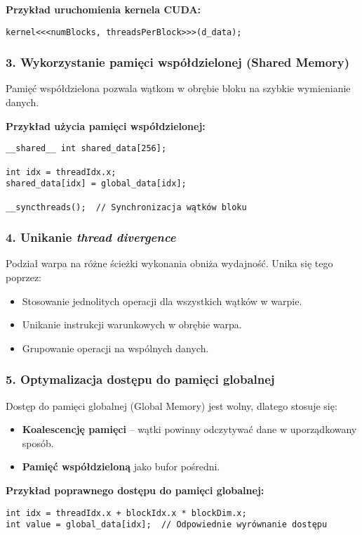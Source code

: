 \textbf{Przykład uruchomienia kernela CUDA:}
\begin{verbatim}
kernel<<<numBlocks, threadsPerBlock>>>(d_data);
\end{verbatim}

\subsubsection{3. Wykorzystanie pamięci współdzielonej (Shared Memory)}
Pamięć współdzielona pozwala wątkom w obrębie bloku na szybkie wymienianie danych.

\textbf{Przykład użycia pamięci współdzielonej:}
\begin{verbatim}
__shared__ int shared_data[256];

int idx = threadIdx.x;
shared_data[idx] = global_data[idx];

__syncthreads();  // Synchronizacja wątków bloku
\end{verbatim}

\subsubsection{4. Unikanie \textit{thread divergence}}
Podział warpa na różne ścieżki wykonania obniża wydajność. Unika się tego poprzez:

\begin{itemize}
    \item Stosowanie jednolitych operacji dla wszystkich wątków w warpie.
    \item Unikanie instrukcji warunkowych w obrębie warpa.
    \item Grupowanie operacji na wspólnych danych.
\end{itemize}

\subsubsection{5. Optymalizacja dostępu do pamięci globalnej}
Dostęp do pamięci globalnej (Global Memory) jest wolny, dlatego stosuje się:
\begin{itemize}
    \item \textbf{Koalescencję pamięci} – wątki powinny odczytywać dane w uporządkowany sposób.
    \item \textbf{Pamięć współdzieloną} jako bufor pośredni.
\end{itemize}

\textbf{Przykład poprawnego dostępu do pamięci globalnej:}
\begin{verbatim}
int idx = threadIdx.x + blockIdx.x * blockDim.x;
int value = global_data[idx];  // Odpowiednie wyrównanie dostępu
\end{verbatim}

